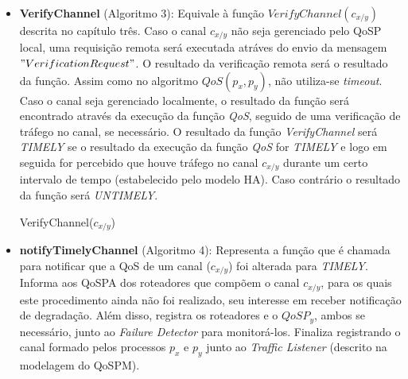 \begin{itemize}
\item \textbf{VerifyChannel} (Algoritmo 3): Equivale à função $VerifyChannel(c_{x/y})$ descrita no capítulo três. Caso o canal $c_{x/y}$ não seja gerenciado pelo QoSP local, uma requisição remota será executada atráves do envio da mensagem $"VerificationRequest"$. O resultado da verificação remota será o resultado da função. Assim como no algoritmo $QoS(p_{x}, p_{y})$, não utiliza-se \textit{timeout}. Caso o canal seja gerenciado localmente, o resultado da função será encontrado através da execução da função \textit{QoS}, seguido de uma verificação de tráfego no canal, se necessário. O resultado da função \textit{VerifyChannel} será \textit{TIMELY} se o resultado da execução da função \textit{QoS} for \textit{TIMELY} e logo em seguida for percebido que houve tráfego no canal $c_{x/y}$ durante um certo intervalo de tempo (estabelecido pelo modelo HA). Caso contrário o resultado da função será \textit{UNTIMELY}.

\begin{algorithm}[H]
	\Else{
		$qos \leftarrow QoS(p_{x}, p_{y})$\;
		\If{$qos = UNTIMELY$}{
			\Return{UNTIMELY}\;
		}
		\Else{
			$starttime \leftarrow CT()$\;
			$timeout \leftarrow \textit{CHANNEL\_DORMANCY\_PERIOD}$\;
			\textbf{wait for}($CT() > timeout$)\;
			\If{$lastMessageTime(p_{x}, p_{y}) < starttime$}{
				\Return{UNTIMELY}\;
			}
			\Else{
				\Return{TIMELY}\;
			}
		}
	}
\caption{VerifyChannel($c_{x/y}$)}
\end{algorithm}

\item \textbf{notifyTimelyChannel} (Algoritmo 4): Representa a função que é chamada para notificar que a QoS de um canal ($c_{x/y}$) foi alterada para \textit{TIMELY}. Informa aos QoSPA dos roteadores que compõem o canal $c_{x/y}$, para os quais este procedimento ainda não foi realizado, seu interesse em receber notificação de degradação. Além disso, registra os roteadores e o $QoSP_{y}$, ambos se necessário, junto ao \textit{Failure Detector} para monitorá-los. Finaliza registrando o canal formado pelos processos $p_{x}$ e $p_{y}$ junto ao \textit{Traffic Listener} (descrito na modelagem do QoSPM).


\end{itemize}
